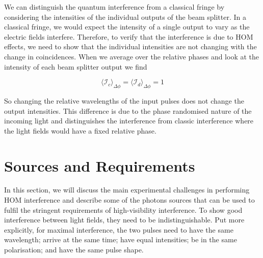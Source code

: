 We can distinguish the quantum interference from a classical fringe by considering the intensities of the individual outputs of the beam splitter. In a classical fringe, we would expect the intensity of a single output to vary as the electric fields interfere. Therefore, to verify that the interference is due to \ac{HOM} effects, we need to show that the individual intensities are not changing with the change in coincidences. When we average over the relative phases and look at the intensity of each beam splitter output we find

\begin{equation}
	\langle \mathcal{I}_c \rangle_{\Delta\phi} = \langle \mathcal{I}_d \rangle_{\Delta\phi} = 1
\end{equation}

So changing the relative wavelengths of the input pulses does not change the output intensities. This difference is due to the phase randomised nature of the incoming light and distinguishes the interference from classic interference where the light fields would have a fixed relative phase.

%

\section{Sources and Requirements}
\label{sec:sources}

In this section, we will discuss the main experimental challenges in performing \ac{HOM} interference and describe some of the photons sources that can be used to fulfil the stringent requirements of high-visibility interference. To show good interference between light fields, they need to be indistinguishable. Put more explicitly, for maximal interference, the two pulses need to have the same wavelength; arrive at the same time; have equal intensities; be in the same polarisation; and have the same pulse shape.

